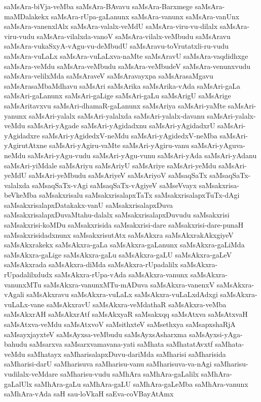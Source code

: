 {saMsAra-biVja-veMba
saMsAra-BAvavu
saMsAra-Barxmege
saMsAra-maMDalakekx
saMsAra-rUpa-gaLanunx
saMsAra-vanunx
saMsAra-vanUnx
saMsAra-vanenxlAlx
saMsAra-valalx-veMdU
saMsAra-viru-vu-dilalx
saMsAra-viru-vudu
saMsAra-vilalxda-vanoV
saMsAra-vilalx-veMbudu
saMsAravu
saMsAra-vukaSxyA-vAgu-vu-deMbudU
saMsAravu-toVrutatxli-ru-vudu
saMsAra-vuLaLx
saMsAra-vuLaLxva-naMte
saMsAravU
saMsAra-vaqdidhxge
saMsAra-veMdu
saMsAra-veMbudu
saMsAra-veMbudeV
saMsAra-venunxvudu
saMsAra-velilxMda
saMsAraveV
saMsAravayxpa
saMsArasaMgavu
saMsArasaMbaMdhavu
saMsAri
saMsArika
saMsArika-vAda
saMsAri-gaLa
saMsAri-gaLanunx
saMsAri-gaLige
saMsAri-gaLu
saMsArigU
saMsArige
saMsAritavxvu
saMsAri-dhamaR-gaLanunx
saMsAriya
saMsAri-yaMte
saMsAri-yanunx
saMsAri-yalalx
saMsAri-yalalxda
saMsAri-yalalx-davanu
saMsAri-yalalx-veMdu
saMsAri-yAgade
saMsAri-yAgidadxnu
saMsAri-yAgidadxrU
saMsAri-yAgidadxre
saMsAri-yAgidedxV-neMdu
saMsAri-yAgidedxV-neMba
saMsAri-yAgirutAtxne
saMsAri-yAgiru-vaMte
saMsAri-yAgiru-vanu
saMsAri-yAguva-neMdu
saMsAri-yAgu-vudu
saMsAri-yAgu-vunu
saMsAri-yAda
saMsAri-yAdanu
saMsAri-yiMdale
saMsAriyu
saMsAriyU
saMsAriye
saMsAri-yeMdu
saMsAri-yeMdU
saMsAri-yeMbudu
saMsAriyeV
saMsAriyoV
saMsaqSaTx
saMsaqSaTx-valalxda
saMsaqSaTx-vAgi
saMsaqSaTx-vAgiyeV
saMseVvayx
saMsakxrisa-beVkeMba
saMsakxrisalu
saMsakxrisalapxTaTx
saMsakxrisalapxTuTx-dAgi
saMsakxrisalapxDatakakx-vanU
saMsakxrisalapxDuva
saMsakxrisalapxDuvaMtahu-dalalx
saMsakxrisalapxDuvudu
saMsakxrisi
saMsakxrisi-koMDu
saMsakxrisida
saMsakxrisi-dare
saMsakxrisi-dare-punaH
saMsakxrisidadxnunx
saMsakxrisutAtx
saMsAkxra
saMsAkxrakAkxgiyeV
saMsAkxrakekx
saMsAkxra-gaLa
saMsAkxra-gaLanunx
saMsAkxra-gaLiMda
saMsAkxra-gaLige
saMsAkxra-gaLu
saMsAkxra-gaLU
saMsAkxra-gaLeV
saMsAkxrada
saMsAkxra-diMda
saMsAkxra-rUpadalilx
saMsAkxra-rUpadalilxdudx
saMsAkxra-rUpa-vAda
saMsAkxra-vanunx
saMsAkxra-vanunxMTu
saMsAkxra-vanunxMTu-mADuva
saMsAkxra-vanenxV
saMsAkxra-vAgali
saMsAkxravu
saMsAkxra-vuLaLx
saMsAkxra-vuLaLxdAdxgi
saMsAkxra-vuLaLx-vane
saMsAkxravU
saMsAkxra-veMdathaR
saMsAkxra-veMba
saMsAkxrAH
saMsAkxrAtf
saMsAkxyaR
saMsakxqq
saMsAtxva
saMsAtxvaH
saMsAtxva-veMdu
saMsAtxvoV
saMsithxteV
saMsethxya
saMsapxshaRjA
saMsayxjayxteV
saMsAyxsa-veMbudu
saMsAyxsAsharxma
saMsAyxsi-yAga-bahudu
saMsarxva
saMsarxvamavana-yati
saMhata
saMhatatAvxtf
saMhata-veMdu
saMhatayx
saMharisalapxDuvu-dariMda
saMharisi
saMharisida
saMharisi-darU
saMharisuva
saMharisu-vanu
saMharisuva-va-nAgi
saMharisu-vudilalx-veMdare
saMharisu-vudu
saMhAra
saMhAra-gaLalilx
saMhAra-gaLalUlx
saMhAra-gaLu
saMhAra-gaLU
saMhAra-gaLeMba
saMhAra-vanunx
saMhAra-vAda
saH
sau-loVkaH
saEva-coVBayAtAmx
}
